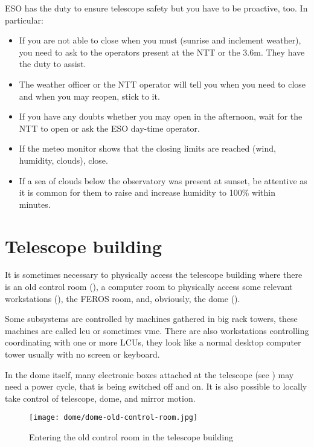 \documentclass[11pt,fleqn,a4paper]{book}
\begin{document}
ESO has the duty to ensure telescope safety but you have to be proactive, too.  In particular:
\begin{itemize}
\item If you are not able to close when you must (sunrise and inclement weather), you need to ask to the operators present at the NTT or the 3.6m. They have the duty to assist.  
\item The weather officer or the NTT operator will tell you when you need to close and when you may reopen, stick to it.
\item If you have any doubts whether you may open in the afternoon, wait for the NTT to open or ask the ESO day-time operator.
\item If the meteo monitor shows that the closing limits are reached (wind, humidity, clouds), close.
\item If a sea of clouds below the observatory was present at sunset, be attentive as it is common for them to raise and increase humidity to 100\% within minutes.
\end{itemize}

\section{Telescope building}

It is sometimes necessary to physically access the telescope building where there is an old control room (), a \gls{computer room} to physically access some relevant workstations (), the FEROS room, and, obviously, the \gls{dome} ().  

Some subsystems are controlled by machines gathered in big rack towers, these machines are called \gls{lcu} or sometimes \gls{vme}.  There are also workstations controlling coordinating with one or more LCUs, they look like a normal desktop computer tower usually with no screen or keyboard.

In the \gls{dome} itself, many electronic boxes attached at the telescope (see ) may need a \gls{power cycle}, that is being switched off and on.  It is also possible to locally take control of telescope, dome, and mirror motion.

\begin{figure}[!ht]
\centering
\texttt{[image: dome/dome-old-control-room.jpg]}
\caption{Entering the old control room in the telescope building}
\label{fig:old-control-room}
\end{figure}
\end{document}
